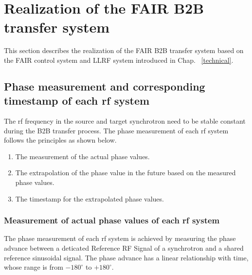 \section{Realization of the FAIR B2B transfer system}
This section describes the realization of the FAIR B2B transfer system based on the FAIR control system and LLRF system introduced in Chap. ~\ref{technical}.
%
\subsection{Phase measurement and corresponding timestamp of each rf system}
The rf frequency in the source and target synchrotron need to be stable constant during the B2B transfer process. The phase measurement of each rf system follows the principles as shown below.

\begin{enumerate}
\item The measurement of the actual phase values.
\item The extrapolation of the phase value in the future based on the measured phase values.
\item The timestamp for the extrapolated phase values.
\end{enumerate}
 \subsubsection{Measurement of actual phase values of each rf system}
The phase measurement of each rf system is achieved by measuring the phase advance between a deticated Reference RF Signal of a synchrotron and a shared reference sinusoidal signal. The phase advance has a linear relationship with time, whose range is from $-180^\circ$ to $+180^\circ$. 


